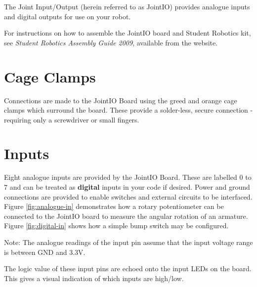\documentclass[a4paper, 12pt]{article}
\begin{document}
The Joint Input/Output (herein referred to as JointIO) provides analogue inputs and digital outputs for use on your robot.  

For instructions on how to assemble the JointIO board and Student Robotics kit, see \textit{Student Robotics Assembly Guide 2009}, available from the website.


\section{Cage Clamps}
Connections are made to the JointIO Board using the greed and orange cage clamps which surround the board. These provide a solder-less, secure connection - requiring only a screwdriver or small fingers. 
\newpage

\section{Inputs}
Eight analogue inputs are provided by the JointIO Board. These are labelled 0 to 7 and can be treated as \textbf{digital} inputs in your code if desired. Power and ground connections are provided to enable switches and external circuits to be interfaced. Figure \ref{fig:analogue-in} demonstrates how a rotary potentiometer can be connected to the JointIO board to measure the angular rotation of an armature. Figure \ref{fig:digital-in} shows how a simple bump switch may be configured.

Note: The analogue readings of the input pin assume that the input voltage range is between GND and 3.3V. 

The logic value of these input pins are echoed onto the input LEDs on the board. This gives a visual indication of which inputs are high/low.
\end{document}
